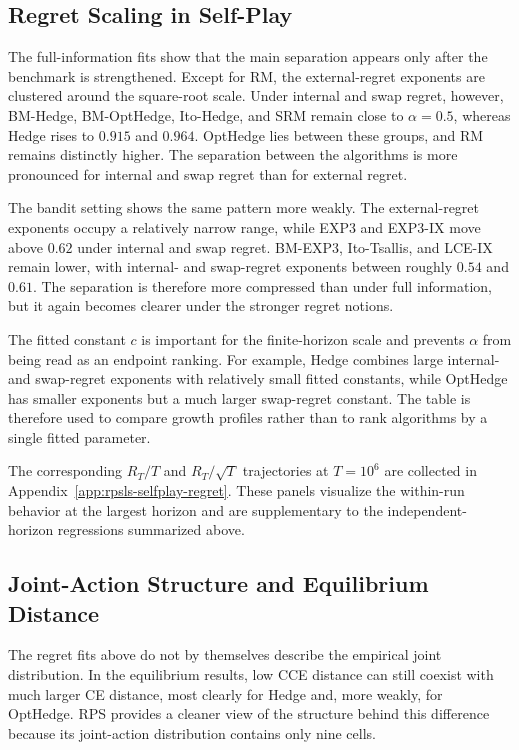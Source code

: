 \subsection{Regret Scaling in Self-Play}
\label{sec:self-play-separation}

The full-information fits show that the main separation appears only after the
benchmark is strengthened. Except for RM, the external-regret exponents are
clustered around the square-root scale. Under internal and swap regret,
however, BM-Hedge, BM-OptHedge, Ito-Hedge, and SRM remain close to
$\alpha=0.5$, whereas Hedge rises to $0.915$ and $0.964$. OptHedge lies between
these groups, and RM remains distinctly higher. The separation between the
algorithms is more pronounced for internal and swap regret than for external regret.

The bandit setting shows the same pattern more weakly. The external-regret
exponents occupy a relatively narrow range, while EXP3 and EXP3-IX move above
$0.62$ under internal and swap regret. BM-EXP3, Ito-Tsallis, and LCE-IX remain
lower, with internal- and swap-regret exponents between roughly $0.54$ and
$0.61$. The separation is therefore more compressed than under full
information, but it again becomes clearer under the stronger regret notions.

The fitted constant $c$ is important for the finite-horizon scale and prevents
$\alpha$ from being read as an endpoint ranking. For example, Hedge combines
large internal- and swap-regret exponents with relatively small fitted
constants, while OptHedge has smaller exponents but a much larger swap-regret
constant. The table is therefore used to compare growth profiles rather than
to rank algorithms by a single fitted parameter.

The corresponding $R_T/T$ and $R_T/\sqrt{T}$ trajectories at $T=10^6$ are
collected in Appendix~\ref{app:rpsls-selfplay-regret}. These panels visualize
the within-run behavior at the largest horizon and are supplementary to the
independent-horizon regressions summarized above.


\subsection{Joint-Action Structure and Equilibrium Distance}
\label{sec:joint-action-structure}
\label{sec:nonmonotone-ce}

The regret fits above do not by themselves describe the empirical joint
distribution. In the equilibrium results, low CCE distance can still coexist
with much larger CE distance, most clearly for Hedge and, more weakly, for
OptHedge. RPS provides a cleaner view of the structure behind this difference
because its joint-action distribution contains only nine cells.

